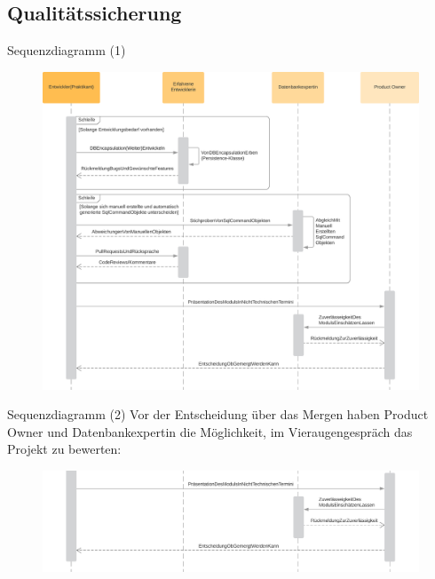 \documentclass[toc]{beamer}
\begin{document}
    \subsection{Qualitätssicherung}
        \begin{frame}{Sequenzdiagramm (1)}
            \begin{figure}[htp]
                    \includegraphics[scale=0.12]{Einfaches Sequenzdiagramm_2.png}
                \end{figure}
        \end{frame}
        
        \begin{frame}{Sequenzdiagramm (2)}
            Vor der Entscheidung über das Mergen haben Product Owner und Datenbankexpertin die Möglichkeit, im Vieraugengespräch das Projekt zu bewerten:
            \begin{figure}[htp]
                    \includegraphics[scale=0.12]{Einfaches Sequenzdiagramm_2_crop.png}
                \end{figure}
        \end{frame}
\end{document}
